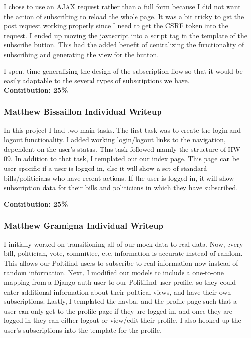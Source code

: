 \documentclass{article}
\newcommand{\n}{\noindent}
\begin{document}
I chose to use an AJAX request rather than a full form because I did not want the action of 
subscribing to reload the whole page.   It was a bit tricky to get the post request working properly since I need to get the CSRF token into 
the request.  I ended up moving the javascript into a script tag in the template of the subscribe button.  This had the added benefit of centralizing
the functionality of subscribing and generating the view for the button. 

I spent time generalizing the design of the subscription flow so that it would be easily adaptable to the several types of
subscriptions we have. \\


\n\textbf{Contribution: 25\%}

\pagebreak

\subsubsection*{Matthew Bissaillon Individual Writeup}

In this project I had two main tasks. The first task was to create the login and logout functionality. I added working login/logout links to the navigation, dependent on the user's status. This task followed mainly the structure of HW 09. In addition to that task, I templated out our index page. This page can be user specific if a user is logged in, else it will show a set of standard bills/politicians who have recent actions. If the user is logged in, it will show subscription data for their bills and politicians in which they have subscribed.

\n\textbf{Contribution: 25\%}
\pagebreak

\subsubsection*{Matthew Gramigna Individual Writeup}

I initially worked on transitioning all of our mock data to real data. Now, every bill, politician, vote, committee, etc. information is accurate instead of random. This allows our Poltifind users to subscribe to real information now instead of random information. Next, I modified our models to include a one-to-one mapping from a Django auth user to our Politifind user profile, so they could enter additional information about their political views, and have their own subscriptions. Lastly, I templated the navbar and the profile page such that a user can only get to the profile page if they are logged in, and once they are logged in they can either logout or view/edit their profile. I also hooked up the user's subscriptions into the template for the profile.\\
\end{document}
